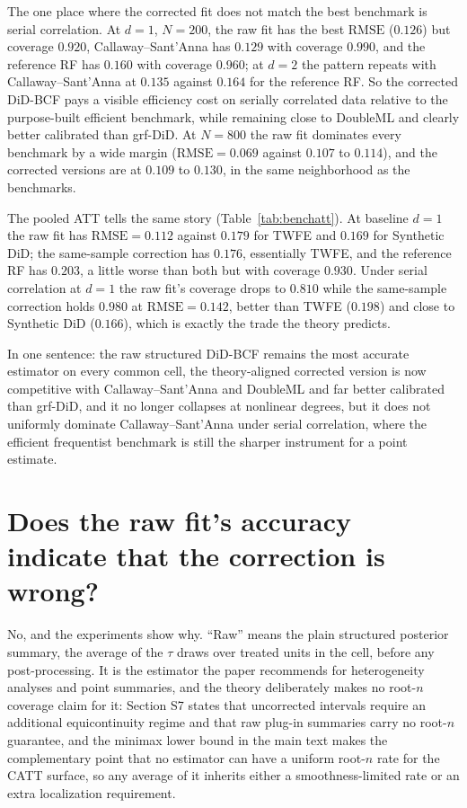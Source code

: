 \documentclass[11pt]{article}
\begin{document}
The one place where the corrected fit does not match the best benchmark is serial
correlation. At $d=1$, $N=200$, the raw fit has the best $\mathrm{RMSE}$ ($0.126$) but
coverage $0.920$, Callaway--Sant'Anna has $0.129$ with coverage $0.990$, and the
reference RF has $0.160$ with coverage $0.960$; at $d=2$ the pattern repeats with
Callaway--Sant'Anna at $0.135$ against $0.164$ for the reference RF. So the corrected
DiD-BCF pays a visible efficiency cost on serially correlated data relative to the
purpose-built efficient benchmark, while remaining close to DoubleML and clearly better
calibrated than grf-DiD. At $N=800$ the raw fit dominates every benchmark by a wide
margin ($\mathrm{RMSE}=0.069$ against $0.107$ to $0.114$), and the corrected versions
are at $0.109$ to $0.130$, in the same neighborhood as the benchmarks.

The pooled ATT tells the same story (Table~\ref{tab:benchatt}). At baseline $d=1$ the
raw fit has $\mathrm{RMSE}=0.112$ against $0.179$ for TWFE and $0.169$ for Synthetic
DiD; the same-sample correction has $0.176$, essentially TWFE, and the reference RF has
$0.203$, a little worse than both but with coverage $0.930$. Under serial correlation
at $d=1$ the raw fit's coverage drops to $0.810$ while the same-sample correction holds
$0.980$ at $\mathrm{RMSE}=0.142$, better than TWFE ($0.198$) and close to Synthetic DiD
($0.166$), which is exactly the trade the theory predicts.

In one sentence: the raw structured DiD-BCF remains the most accurate estimator on every
common cell, the theory-aligned corrected version is now competitive with
Callaway--Sant'Anna and DoubleML and far better calibrated than grf-DiD, and it no
longer collapses at nonlinear degrees, but it does not uniformly dominate
Callaway--Sant'Anna under serial correlation, where the efficient frequentist benchmark
is still the sharper instrument for a point estimate.

\section{Does the raw fit's accuracy indicate that the correction is wrong?}
\label{sec:rawtruth}

No, and the experiments show why. ``Raw'' means the plain structured posterior summary,
the average of the $\tau$ draws over treated units in the cell, before any
post-processing. It is the estimator the paper recommends for heterogeneity analyses and
point summaries, and the theory deliberately makes no root-$n$ coverage claim for it:
Section S7 states that uncorrected intervals require an additional equicontinuity regime
and that raw plug-in summaries carry no root-$n$ guarantee, and the minimax lower bound
in the main text makes the complementary point that no estimator can have a uniform
root-$n$ rate for the CATT surface, so any average of it inherits either a
smoothness-limited rate or an extra localization requirement.
\end{document}
